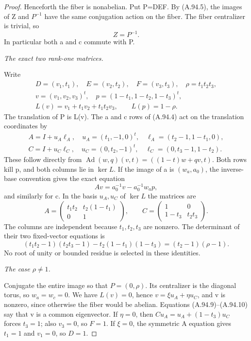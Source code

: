 \begin{proof}
Henceforth the fiber is nonabelian. Put P=DEF. By (A.94.5),
the images of Z and \(P^{-1}\) have the same conjugation
action on the fiber. The fiber centralizer is trivial, so
\[
                         Z=P^{-1}.
\tag{A.94.6}
\]
In particular both a and c commute with P.

\emph{The exact two rank-one matrices.}\par
Write
\[
\begin{gathered}
 D=(v_1,t_1),\quad E=(v_2,t_2),\quad F=(v_3,t_3),
 \quad\rho=t_1t_2t_3,\\
 v=(v_1,v_2,v_3)^t,\quad
 p=(1-t_1,1-t_2,1-t_3)^t,\\
 L(v)=v_1+t_1v_2+t_1t_2v_3,\qquad L(p)=1-\rho.
\end{gathered}
\tag{A.94.7}
\]
The translation of P is L(v). The a and c rows of (A.94.4)
act on the translation coordinates by
\[
\begin{gathered}
 A=I+u_A\ell_A,\quad u_A=(t_1,-1,0)^t,
       \quad\ell_A=(t_2-1,1-t_1,0),\\
 C=I+u_C\ell_C,\quad u_C=(0,t_2,-1)^t,
       \quad\ell_C=(0,t_3-1,1-t_2).
\end{gathered}
\tag{A.94.8}
\]
These follow directly from
\(\operatorname{Ad}(w,q)(v,t)=((1-t)w+qv,t)\).
Both rows kill p, and both columns lie in \(\ker L\).
If the image of a is \((w_a,a_0)\), the inverse-base
convention gives the exact equation
\[
                    Av=a_0^{-1}v-a_0^{-1}w_ap,
\tag{A.94.9}
\]
and similarly for c. In the basis \(u_A,u_C\) of \(\ker L\)
the matrices are
\[
 A=\begin{pmatrix}t_1t_2&t_2(1-t_1)\\0&1\end{pmatrix},
 \qquad
 C=\begin{pmatrix}1&0\\1-t_3&t_2t_3\end{pmatrix}.
\tag{A.94.10}
\]
The columns are independent because \(t_1,t_2,t_3\) are
nonzero. The determinant of their two fixed-vector equations is
\[
 (t_1t_2-1)(t_2t_3-1)-t_2(1-t_1)(1-t_3)
                 =(t_2-1)(\rho-1).
\tag{A.94.11}
\]
No root of unity or bounded residue is selected in these identities.

\emph{The case \(\rho\ne1\).}\par
Conjugate the entire image so that \(P=(0,\rho)\).
Its centralizer is the diagonal torus, so \(w_a=w_c=0\).
We have \(L(v)=0\), hence \(v=\xi u_A+\eta u_C\),
and v is nonzero, since otherwise the fiber would be abelian.
Equations (A.94.9)--(A.94.10) say that v is a common eigenvector.
If \(\eta=0\), then
\(Cu_A=u_A+(1-t_3)u_C\) forces \(t_3=1\); also \(v_3=0\),
so \(F=1\). If \(\xi=0\), the symmetric A equation gives
\(t_1=1\) and \(v_1=0\), so \(D=1\).


\end{proof}
